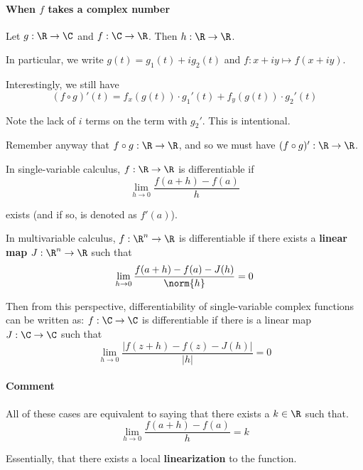 \paragraph{When $f$ takes a complex number} Let $g:\R\to\C$ and
$f:\C\to\R$. Then $h:\R\to\R$.

In particular, we write $g(t)=g_1(t)+ig_2(t)$ and $f:x+iy\mapsto
	f(x+iy)$.

Interestingly, we still have
$$
	(f\circ g)'(t) =
	f_x(g(t))\cdot {g_1}'(t)+f_y(g(t))\cdot {g_2}'(t)
$$

Note the lack of $i$ terms on the term with ${g_2}'$. This is
intentional.

Remember anyway that $f\circ g:\R\to\R$, and so we must have $(f\circ
	g)':\R\to\R$.

\label{c62315d}

In single-variable calculus, $f:\R\to\R$ is differentiable if
$$
	\lim_{h\to0}\frac{f(a+h)-f(a)}h
$$

exists (and if so, is denoted as $f'(a)$).

In multivariable calculus, $f:\R^n\to\R$ is differentiable if there
exists a \textbf{linear map} $J:\R^n\to\R$ such that
$$
	\lim_{h\to0}\frac{f(a+h)-f(a)-J(h)}{\norm{h}}=0
$$

Then from this perspective, differentiability of single-variable
complex functions can be written as:
$f:\C\to\C$ is differentiable if there is a linear map $J:\C\to\C$ such that
$$
	\lim_{h\to0}\frac{|f(z+h)-f(z)-J(h)|}{|h|}=0
$$

\paragraph{Comment}

All of these cases are equivalent to saying that there exists a
$k\in\R$ such that.
$$
	\lim_{h\to0}\frac{f(a+h)-f(a)}h=k
$$

Essentially, that there exists a local \textbf{linearization} to the
function.
